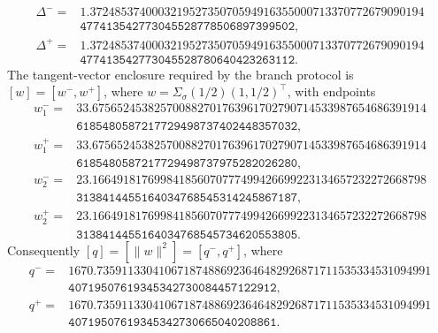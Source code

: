 {\footnotesize
\[
\begin{aligned}
\Delta^-={}&
\mathtt{1.372485374000321952735070594916355000713370772679090194}\\
&\mathtt{477413542773045528778506897399502},\\
\Delta^+={}&
\mathtt{1.372485374000321952735070594916355000713370772679090194}\\
&\mathtt{477413542773045528780640423263112}.
\end{aligned}
\]
}
The tangent-vector enclosure required by the branch protocol is
\([w]=[w^-,w^+]\), where \(w=\Sigma_\sigma(1/2)(1,1/2)^\top\), with endpoints
{\footnotesize
\[
\begin{aligned}
w_1^-={}&
\mathtt{33.675652453825700882701763961702790714533987654686391914}\\
&\mathtt{6185480587217729498737402448357032},\\
w_1^+={}&
\mathtt{33.675652453825700882701763961702790714533987654686391914}\\
&\mathtt{6185480587217729498737975282026280},\\
w_2^-={}&
\mathtt{23.166491817699841856070777499426699223134657232272668798}\\
&\mathtt{3138414455164034768545314245867187},\\
w_2^+={}&
\mathtt{23.166491817699841856070777499426699223134657232272668798}\\
&\mathtt{3138414455164034768545734620553805}.
\end{aligned}
\]
}
Consequently \([q]=[\|w\|^2]=[q^-,q^+]\), where
{\footnotesize
\[
\begin{aligned}
q^-={}&
\mathtt{1670.735911330410671874886923646482926871711535334531094991}\\
&\mathtt{40719507619345342730084457122912},\\
q^+={}&
\mathtt{1670.735911330410671874886923646482926871711535334531094991}\\
&\mathtt{40719507619345342730665040208861}.
\end{aligned}
\]
}

